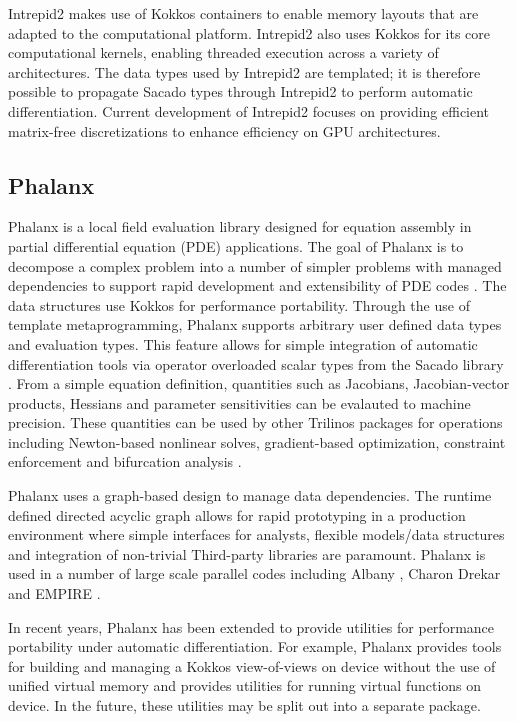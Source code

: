Intrepid2 makes use of Kokkos containers to enable memory layouts that are adapted to the computational platform. Intrepid2 also uses Kokkos for its core computational kernels, enabling threaded execution across a variety of architectures. The data types used by Intrepid2 are templated; it is therefore possible to propagate Sacado types through Intrepid2 to perform automatic differentiation. Current development of Intrepid2 focuses on providing efficient matrix-free discretizations to enhance efficiency on GPU architectures. 

\subsection{Phalanx}
Phalanx is a local field evaluation library designed for equation assembly in partial differential equation (PDE) applications. The goal of Phalanx is to decompose a complex problem into a number of simpler problems with managed dependencies to support rapid development and extensibility of PDE codes \cite{Notz2012,pawlowski2012automating,pawlowski2012automatingpart2}. The data structures use Kokkos \cite{trott2021kokkos} for performance portability. Through the use of template metaprogramming, Phalanx supports arbitrary user defined data types and evaluation types. This feature allows for simple integration of automatic differentiation tools via operator overloaded scalar types from the Sacado library \cite{phipps2022automatic}. From a simple equation definition, quantities such as Jacobians, Jacobian-vector products, Hessians and parameter sensitivities can be evalauted to machine precision. These quantities can be used by other Trilinos packages for operations including Newton-based nonlinear solves, gradient-based optimization, constraint enforcement and bifurcation analysis \cite{pawlowski2012automating,pawlowski2012automatingpart2}.

Phalanx uses a graph-based design to manage data dependencies. The runtime defined directed acyclic graph allows for rapid prototyping in a production environment where simple interfaces for analysts, flexible models/data structures and integration of non-trivial Third-party libraries are paramount. Phalanx is used in a number of large scale parallel codes including Albany \cite{Salinger2016}, Charon \cite{CharonUsersManual2020} Drekar \cite{Crockatt2022,Miller2019,Shadid2016mhd} and EMPIRE \cite{Bettencourt2021}.

In recent years, Phalanx has been extended to provide utilities for performance portability under automatic differentiation. For example, Phalanx provides tools for building and managing a Kokkos view-of-views on device without the use of unified virtual memory and provides utilities for running virtual functions on device. In the future, these utilities may be split out into a separate package.

